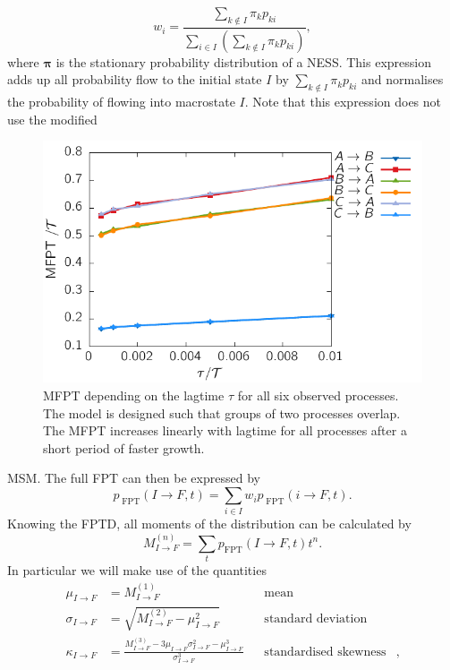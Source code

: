 \begin{equation}
w_i = \frac{ \sum_{k \notin I } \pi_k p_{ki} }{\sum_{i \in I} \left( \sum_{k \notin I } \pi_k p_{ki} \right ) } ,
\end{equation}
where $\boldsymbol{\pi}$ is the stationary probability distribution of a NESS. 
This expression adds up all probability flow to the initial state $I$ by 
$\sum_{k \notin I } \pi_k p_{ki}$ and normalises the probability of flowing 
into macrostate $I$. Note that this expression does not use the modified 
\begin{figure}[t]
\centering
 \includegraphics{../plots/MSM/tao_MFPT.pdf}
\caption[Mean first-passage time depending on the lagtime $\tau$ for all six observed processes for the 1D system.]{MFPT depending on the lagtime $\tau$ for all six observed processes. The model is designed such that groups of two processes overlap. The MFPT increases linearly with lagtime for all processes after a short period of faster growth.} 
\label{fig:tau_MFPT}
\end{figure} 
MSM. The full FPT can then be expressed by
\begin{equation}
p_{\;\text{FPT}}(I \to F,t)  = \sum_{i \in I} w_i p_{\;\text{FPT}}(i \to F,t)  .
\end{equation}
Knowing the FPTD, all moments of the distribution can be calculated by
\begin{equation}
M_{I \to F}^{(n)} = \sum_t p_{\text{FPT}} (I \to F,t) t^n.
\end{equation}
In particular we will make use of the quantities
\begin{equation}
 \begin{aligned}
  \mu_{I \to F} &= M_{I \to F}^{(1)} & \;\;\;\text{mean}& \\
  \sigma_{I \to F} &=  \sqrt{M_{I \to F}^{(2)} - \mu_{I \to F}^2 } & \;\;\;\text{standard deviation}& \\
  \kappa_{I \to F} &= \frac{ M_{I \to F}^{(3)} -3 \mu_{I \to F} \sigma_{I \to F}^2-\mu_{I \to F}^3 }{\sigma_{I \to F}^3}& \;\;\;\text{standardised skewness}& ,\\
 \end{aligned}
\end{equation}
